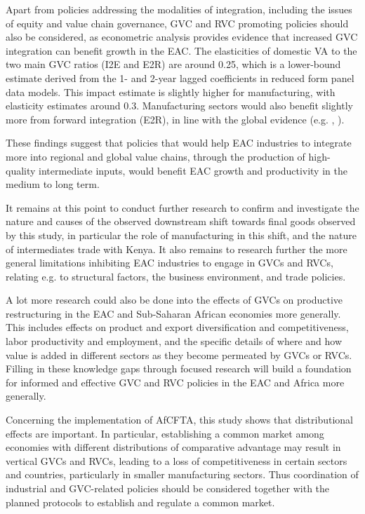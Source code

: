\documentclass[a4paper]{article}
\begin{document}
Apart from policies addressing the modalities of integration, including the issues of equity and value chain governance, GVC and RVC promoting policies should also be considered, as econometric analysis provides evidence that increased GVC integration can benefit growth in the EAC. The elasticities of domestic VA to the two main GVC ratios  (I2E and E2R) are around 0.25, which is a lower-bound estimate derived from the 1- and 2-year lagged coefficients in reduced form panel data models.  This impact estimate is slightly higher for manufacturing, with elasticity estimates around 0.3. Manufacturing sectors would also benefit slightly more from forward integration (E2R), in line with the global evidence (e.g.  \citet{Kummritz20161}, \citet{kummritz2015global}). \newline

These findings suggest that policies that would help EAC industries to integrate more into regional and global value chains, through the production of high-quality intermediate inputs, would benefit EAC growth and productivity in the medium to long term. \newline 

It remains at this point to conduct further research to confirm and investigate the nature and causes of the observed downstream shift towards final goods observed by this study, in particular the role of manufacturing in this shift, and the nature of intermediates trade with Kenya. It also remains to research further the more general limitations inhibiting EAC industries to engage in GVCs and RVCs, relating e.g. to structural factors, the business environment, and trade policies. \newline

A lot more research could also be done into the effects of GVCs on productive restructuring in the EAC and Sub-Saharan African economies more generally. This includes effects on product and export diversification and competitiveness, labor productivity and employment, and the specific details of where and how value is added in different sectors as they become permeated by GVCs or RVCs. Filling in these knowledge gaps through focused research will build a foundation for informed and effective GVC and RVC policies in the EAC and Africa more generally. \newline

Concerning the implementation of AfCFTA, this study shows that distributional effects are important. In particular, establishing a common market among economies with different distributions of comparative advantage may result in vertical GVCs and RVCs, leading to a loss of competitiveness in certain sectors and countries, particularly in smaller manufacturing sectors. Thus coordination of industrial and GVC-related policies should be considered together with the planned protocols to establish and regulate a common market.
\end{document}
